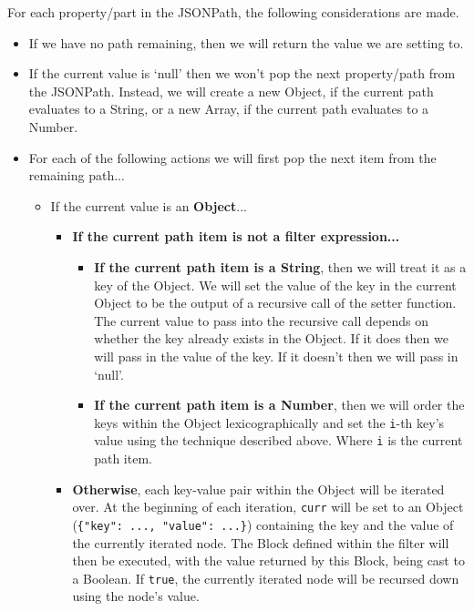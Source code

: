 \begin{center}
    For each property/part in the JSONPath, the following considerations are made.
    \begin{itemize}
        \item If we have no path remaining, then we will return the value we are setting to.
        \item If the current value is `null' then we won't pop the next property/path from the JSONPath. Instead, we will create a new Object, if the current path evaluates to a String, or a new Array, if the current path evaluates to a Number.
        \item For each of the following actions we will first pop the next item from the remaining path...
        \begin{itemize}
            \item If the current value is an \textbf{Object}...
            \begin{itemize}
                \item \textbf{If the current path item is not a filter expression...}
                \begin{itemize}
                    \item \textbf{If the current path item is a String}, then we will treat it as a key of the Object. We will set the value of the key in the current Object to be the output of a recursive call of the setter function. The current value to pass into the recursive call depends on whether the key already exists in the Object. If it does then we will pass in the value of the key. If it doesn't then we will pass in `null'.
                    \item \textbf{If the current path item is a Number}, then we will order the keys within the Object lexicographically and set the \verb|i|-th key's value using the technique described above. Where \verb|i| is the current path item.
                \end{itemize}
                \item \textbf{Otherwise}, each key-value pair within the Object will be iterated over. At the beginning of each iteration, \verb|curr| will be set to an Object (\verb|{"key": ..., "value": ...}|) containing the key and the value of the currently iterated node. The Block defined within the filter will then be executed, with the value returned by this Block, being cast to a Boolean. If \verb|true|, the currently iterated node will be recursed down using the node's value.
            \end{itemize}

\end{itemize}
\end{itemize}
\end{center}
